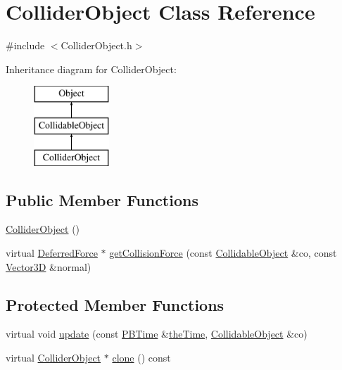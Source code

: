 \hypertarget{class_collider_object}{\section{Collider\-Object Class Reference}
\label{class_collider_object}
}


{\ttfamily \#include $<$Collider\-Object.\-h$>$}

Inheritance diagram for Collider\-Object\-:\begin{figure}[H]
\begin{center}
\leavevmode
\includegraphics[height=3.000000cm]{class_collider_object}
\end{center}
\end{figure}
\subsection*{Public Member Functions}
\begin{DoxyCompactItemize}
\item 
\hyperlink{class_collider_object_a08f4c5989ad7601eb05837179cf17aac}{Collider\-Object} ()
\item 
virtual \hyperlink{class_deferred_force}{Deferred\-Force} $\ast$ \hyperlink{class_collider_object_a9439b0a0d1465b07734f4886866c056f}{get\-Collision\-Force} (const \hyperlink{class_collidable_object}{Collidable\-Object} \&co, const \hyperlink{class_vector3_d}{Vector3\-D} \&normal)
\end{DoxyCompactItemize}
\subsection*{Protected Member Functions}
\begin{DoxyCompactItemize}
\item 
virtual void \hyperlink{class_collider_object_a3e8987fc6f558f65bb749f2144551483}{update} (const \hyperlink{class_p_b_time}{P\-B\-Time} \&\hyperlink{_physically_based_8h_a766da334af281a8fa1ed5cf404d0ec45}{the\-Time}, \hyperlink{class_collidable_object}{Collidable\-Object} \&co)
\item 
virtual \hyperlink{class_collider_object}{Collider\-Object} $\ast$ \hyperlink{class_collider_object_a5bdb3554ca95ddfe4045f17634537cca}{clone} () const 
\end{DoxyCompactItemize}
